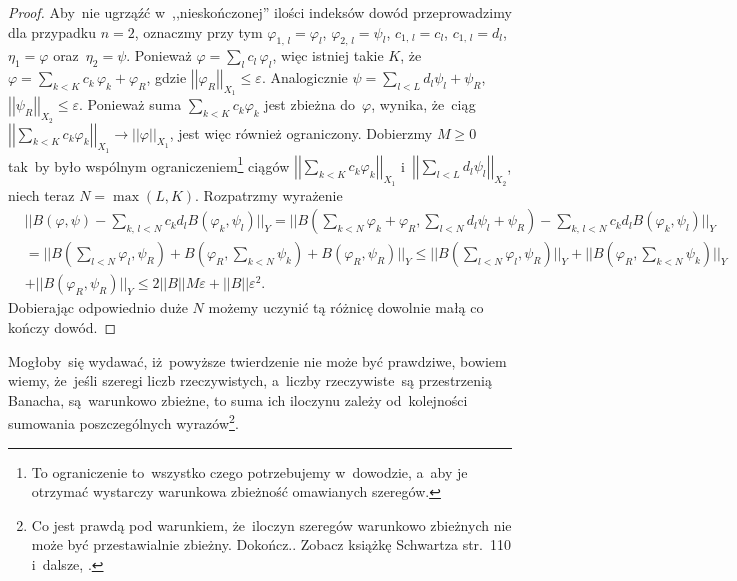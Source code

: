 \documentclass[a4paper,11pt]{article}
\newcommand{\ra}{\rightarrow}
\newcommand{\norm}[1]{\left|\left| #1 \right|\right|}
\newcommand{\veps}{\varepsilon}
\newcommand{\vp}{\varphi}
\newcommand{\Sum}{\sum\limits}
\newcommand{\Dok}{{\color{red} Dokończ.}}
\begin{document}
\begin{proof}
  Aby~nie ugrząźć w~,,nieskończonej'' ilości indeksów dowód
  przeprowadzimy dla przypadku $n = 2$, oznaczmy przy tym
  $\vp_{ 1,\, l } = \vp_{ l }$, $\vp_{ 2, \, l } = \psi_{ l }$,
  $c_{ 1, \, l } = c_{ l }$, $c_{ 1, \, l } = d_{ l }$,
  $\eta_{ 1 } = \vp$ oraz~$\eta_{ 2 } = \psi$. Ponieważ
  $\vp = \sum_{ l } c_{ l } \, \vp_{ l }$, więc istniej takie $K$,
  że~$\vp = \sum_{ k < K } c_{ k } \, \vp_{ k } + \vp_{ R }$, gdzie
  $\norm{ \vp_{ R } }_{ X_{ 1 } } \leq \veps$. Analogicznie
  $\psi = \sum_{ l < L } d_{ l } \psi_{ l } + \psi_{ R }$,
  $\norm{ \psi_{ R } }_{ X_{ 2 } } \leq \veps$. Ponieważ suma
  $\sum_{ k < K } c_{ k } \vp_{ k }$ jest zbieżna do~$\vp$, wynika,
  że~ciąg
  $\norm{ \sum_{ k < K } c_{ k } \vp_{ k } }_{ X_{ 1 } } \ra \norm{
    \vp }_{ X_{ 1 } }$, jest więc również ograniczony. Dobierzmy
  $M \geq 0$ tak~by było wspólnym ograniczeniem\footnote{To
    ograniczenie to~wszystko czego potrzebujemy w~dowodzie, a~aby je
    otrzymać wystarczy warunkowa zbieżność omawianych szeregów.}
  ciągów $\norm{ \sum_{ k < K } c_{ k } \vp_{ k } }_{ X_{ 1 } }$
  i~$\norm{ \sum_{ l < L } d_{ l } \psi_{ l } }_{ X_{ 2 } }$, niech
  teraz $N = \max( L, K )$. Rozpatrzmy wyrażenie
  \begin{equation*}
    \begin{split}
      & || B( \vp, \psi ) - \Sum_{ k, \, l < N } c_{ k } d_{ l } B(
      \vp_{ k }, \psi_{ l } ) ||_{ Y } = || B( \Sum_{ k < N } \vp_{ k
      } + \vp_{ R }, \Sum_{ l < N } d_{ l } \psi_{ l } + \psi_{ R }) -
      \Sum_{ k,\, l < N } c_{ k } d_{ l }
      B( \vp_{ k }, \psi_{ l } ) ||_{ Y } \\
      &= || B( \Sum_{ l < N } \vp_{ l }, \psi_{ R } ) + B( \vp_{ R },
      \Sum_{ k < N } \psi_{ k } ) + B( \vp_{ R }, \psi_{ R } ) ||_{ Y
      } \leq || B( \Sum_{ l < N } \vp_{ l }, \psi_{ R } ) ||_{ Y }
      + || B( \vp_{ R }, \Sum_{ k < N } \psi_{ k } ) ||_{ Y } \\
      &+ || B( \vp_{ R }, \psi_{ R } ) ||_{ Y } \leq 2 \norm{ B } M
      \veps + \norm{ B } \veps^{ 2 }.
    \end{split}
  \end{equation*}
  Dobierając odpowiednio duże $N$ możemy uczynić tą różnicę dowolnie
  małą co kończy dowód.
\end{proof}

Mogłoby~się wydawać, iż~powyższe twierdzenie nie może być prawdziwe,
bowiem wiemy, że~jeśli szeregi liczb rzeczywistych, a~liczby
rzeczywiste~są przestrzenią Banacha, są~warunkowo zbieżne, to suma ich
iloczynu zależy od~kolejności sumowania poszczególnych
wyrazów\footnote{Co jest prawdą pod warunkiem, że~iloczyn szeregów
  warunkowo zbieżnych nie może być przestawialnie zbieżny. \Dok.
  Zobacz książkę Schwartza str.~110 i~dalsze,
  \cite{SchwartzKursAnalizyMatematycznej79}.}.
\end{document}
